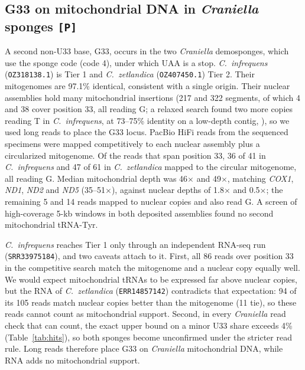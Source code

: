 \documentclass[11pt, a4paper]{article}
\begin{document}
\subsection{G33 on mitochondrial DNA in \textit{Craniella} sponges \texttt{[P]}}\label{sec:cran}
A second non-U33 base, G33, occurs in the two \textit{Craniella} demosponges, which use the sponge code (code 4), under which UAA is a stop. \textit{C.\ infrequens} (\texttt{OZ318138.1}) is Tier 1 and \textit{C.\ zetlandica} (\texttt{OZ407450.1}) Tier 2. Their mitogenomes are 97.1\% identical, consistent with a single origin. Their nuclear assemblies hold many mitochondrial insertions (217 and 322 segments, of which 4 and 38 cover position 33, all reading G; a relaxed search found two more copies reading T in \textit{C.\ infrequens}, at 73--75\% identity on a low-depth contig, ), so we used long reads to place the G33 locus. PacBio HiFi reads from the sequenced specimens were mapped competitively to each nuclear assembly plus a circularized mitogenome. Of the reads that span position 33, 36 of 41 in \textit{C.\ infrequens} and 47 of 61 in \textit{C.\ zetlandica} mapped to the circular mitogenome, all reading G. Median mitochondrial depth was 46$\times$ and 49$\times$, matching \textit{COX1}, \textit{ND1}, \textit{ND2} and \textit{ND5} (35--51$\times$), against nuclear depths of 1.8$\times$ and 0.5$\times$; the remaining 5 and 14 reads mapped to nuclear copies and also read G. A screen of high-coverage 5-kb windows in both deposited assemblies found no second mitochondrial tRNA-Tyr.

\textit{C.\ infrequens} reaches Tier 1 only through an independent RNA-seq run (\texttt{SRR33975184}), and two caveats attach to it. First, all 86 reads over position 33 in the competitive search match the mitogenome and a nuclear copy equally well. We would expect mitochondrial tRNAs to be expressed far above nuclear copies, but the RNA of \textit{C.\ zetlandica} (\texttt{ERR14857142}) contradicts that expectation: 94 of its 105 reads match nuclear copies better than the mitogenome (11 tie), so these reads cannot count as mitochondrial support. Second, in every \textit{Craniella} read check that can count, the exact upper bound on a minor U33 share exceeds 4\% (Table~\ref{tab:hits}), so both sponges become unconfirmed under the stricter read rule. Long reads therefore place G33 on \textit{Craniella} mitochondrial DNA, while RNA adds no mitochondrial support.
\end{document}
